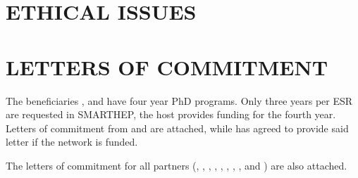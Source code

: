 \documentclass[11pt,a4paper]{article}
\def\acronym{SMARTHEP\xspace}
\begin{document}
\label{sec:capacities}























%
\clearpage \newpage
\section*{ETHICAL ISSUES}

\clearpage 
\section*{LETTERS OF COMMITMENT}

The beneficiaries \helsinkientity, \lundentity and \nikhefentity have four year PhD
programs. Only three years per ESR are requested in \acronym, the host
provides funding for the fourth year. Letters of commitment from
\lundentity and \nikhefentity are attached, while \helsinkientity has agreed
to provide said letter if the network is funded.  

The letters of commitment for all partners (\fleetmaticsentity,
\ximantisentity, \lightboxentity, \cathientity, \wildtreeentity,
\santiagoentity, \pisaentity, \ohioentity, \oregonentity and
\cincinnatientity) are also attached. 
\end{document}
